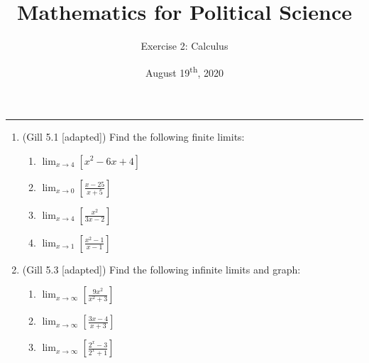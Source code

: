 \documentclass[11pt]{article}
\title{\Large{\bf{\vspace{-100pt}Mathematics for Political Science \vspace{-15pt}}}}
\author{\large{Exercise 2: Calculus}}
\date{August 19\textsuperscript{th}, 2020}
\begin{document}
\maketitle

\hrule

\vspace{.5cm}

\begin{enumerate}


\item (Gill 5.1 [adapted]) Find the following finite limits:
\begin{enumerate}
\item $\displaystyle\lim_{x\rightarrow 4} [x^2 - 6x + 4]$ %
\item $\displaystyle\lim_{x\rightarrow 0} [\frac{x-25}{x+5}]$ %
\item $\displaystyle\lim_{x\rightarrow 4} [\frac{x^2}{3x-2}]$ %
\item $\displaystyle\lim_{x\rightarrow 1} [\frac{x^2 - 1}{x-1}]$ %
\end{enumerate}

\vspace{.5cm}

\item (Gill 5.3 [adapted]) Find the following infinite limits and graph:
\begin{enumerate}
\item $\displaystyle\lim_{x\rightarrow \infty} [\frac{9x^2}{x^2 + 3}]$ %
\item $\displaystyle\lim_{x\rightarrow \infty} [\frac{3x-4}{x+3}]$ %
\item $\displaystyle\lim_{x\rightarrow \infty} [\frac{2^x - 3}{2^x + 1}]$ %
\end{enumerate}

\vspace{.5cm}


\end{enumerate}
\end{document}

